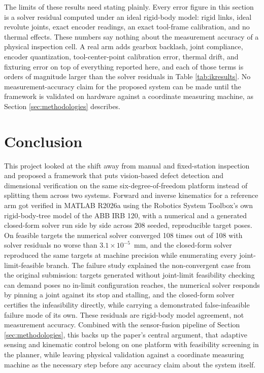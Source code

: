\documentclass[conference]{IEEEtran}
\begin{document}
The limits of these results need stating plainly. Every error figure in this section is a solver residual computed under an ideal rigid-body model: rigid links, ideal revolute joints, exact encoder readings, an exact tool-frame calibration, and no thermal effects. These numbers say nothing about the measurement accuracy of a physical inspection cell. A real arm adds gearbox backlash, joint compliance, encoder quantization, tool-center-point calibration error, thermal drift, and fixturing error on top of everything reported here, and each of those terms is orders of magnitude larger than the solver residuals in Table \ref{tab:ikresults}. No measurement-accuracy claim for the proposed system can be made until the framework is validated on hardware against a coordinate measuring machine, as Section \ref{sec:methodologies} describes.

\section{Conclusion}
This project looked at the shift away from manual and fixed-station inspection and proposed a framework that puts vision-based defect detection and dimensional verification on the same six-degree-of-freedom platform instead of splitting them across two systems. Forward and inverse kinematics for a reference arm got verified in MATLAB R2026a using the Robotics System Toolbox's own rigid-body-tree model of the ABB IRB 120, with a numerical and a generated closed-form solver run side by side across 208 seeded, reproducible target poses. On feasible targets the numerical solver converged 108 times out of 108 with solver residuals no worse than $3.1\times10^{-5}$~mm, and the closed-form solver reproduced the same targets at machine precision while enumerating every joint-limit-feasible branch. The failure study explained the non-convergent case from the original submission: targets generated without joint-limit feasibility checking can demand poses no in-limit configuration reaches, the numerical solver responds by pinning a joint against its stop and stalling, and the closed-form solver certifies the infeasibility directly, while carrying a demonstrated false-infeasible failure mode of its own. These residuals are rigid-body model agreement, not measurement accuracy. Combined with the sensor-fusion pipeline of Section \ref{sec:methodologies}, this backs up the paper's central argument, that adaptive sensing and kinematic control belong on one platform with feasibility screening in the planner, while leaving physical validation against a coordinate measuring machine as the necessary step before any accuracy claim about the system itself.
\end{document}
